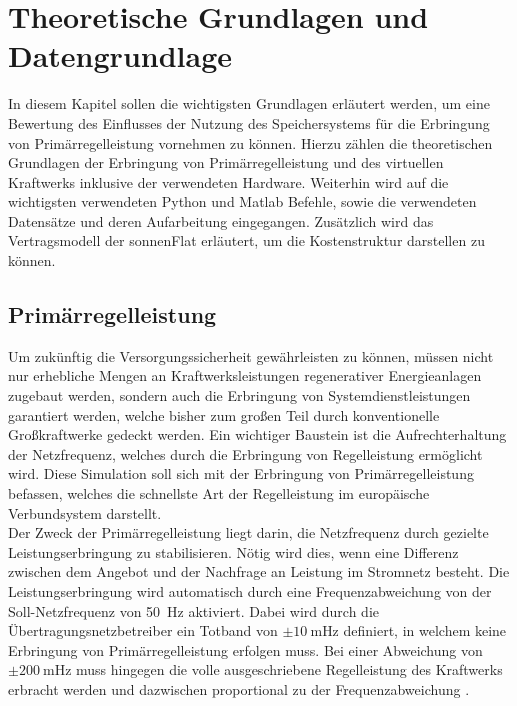 
\section{Theoretische Grundlagen und Datengrundlage}

In diesem Kapitel sollen die wichtigsten Grundlagen erläutert werden, um eine Bewertung des Einflusses der Nutzung des Speichersystems für die Erbringung von Primärregelleistung vornehmen zu können. Hierzu zählen die theoretischen Grundlagen der Erbringung von Primärregelleistung und des virtuellen Kraftwerks inklusive der verwendeten Hardware. Weiterhin wird auf die wichtigsten verwendeten Python und Matlab Befehle, sowie die verwendeten Datensätze und deren Aufarbeitung eingegangen. Zusätzlich wird das Vertragsmodell der sonnenFlat erläutert, um die Kostenstruktur darstellen zu können.

\subsection{Primärregelleistung}

Um zukünftig die Versorgungssicherheit gewährleisten zu können, müssen nicht nur erhebliche Mengen an Kraftwerksleistungen regenerativer Energieanlagen zugebaut werden, sondern auch die Erbringung von Systemdienstleistungen garantiert werden, welche bisher zum großen Teil durch konventionelle Großkraftwerke gedeckt werden. Ein wichtiger Baustein ist die Aufrechterhaltung der Netzfrequenz, welches durch die Erbringung von Regelleistung ermöglicht wird. Diese Simulation soll sich mit der Erbringung von Primärregelleistung befassen, welches die schnellste Art der Regelleistung im europäische Verbundsystem darstellt.\medskip\\
Der Zweck der Primärregelleistung liegt darin, die Netzfrequenz durch gezielte Leistungserbringung zu stabilisieren. Nötig wird dies, wenn eine Differenz zwischen dem Angebot und der Nachfrage an Leistung im Stromnetz besteht. Die Leistungserbringung wird automatisch durch eine Frequenzabweichung von der Soll-Netzfrequenz von \SI{50}{\hertz} aktiviert. Dabei wird durch die Übertragungsnetzbetreiber ein Totband von $\pm \SI{10}{\milli\hertz}$ definiert, in welchem keine Erbringung von Primärregelleistung erfolgen muss. Bei einer Abweichung von $\pm \SI{200}{\milli\hertz}$ muss hingegen die volle ausgeschriebene Regelleistung des Kraftwerks erbracht werden und dazwischen proportional zu der Frequenzabweichung \parencite{nextKW20}.


